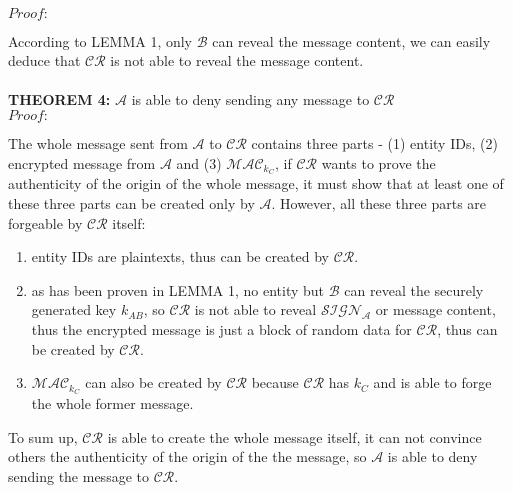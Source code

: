 \\
\emph{$Proof:$} \par
According to LEMMA 1, only $\mathcal{B}$ can reveal the message content, we can easily deduce that $\mathcal{CR}$ is not able to reveal the message content.
\\
\\
\textbf{THEOREM 4:} $\mathcal{A}$ is able to deny sending any message to $\mathcal{CR}$
\\
\emph{$Proof:$} \par
The whole message sent from $\mathcal{A}$ to $\mathcal{CR}$ contains three parts - (1) entity IDs, (2) encrypted message from $\mathcal{A}$ and (3) $\mathcal{MAC}_{k_C}$, if $\mathcal{CR}$ wants to prove the authenticity of the origin of the whole message, it must show that at least one of these three parts can be created only by $\mathcal{A}$. However, all these three parts are forgeable by $\mathcal{CR}$ itself:
\begin{enumerate}
\item entity IDs are plaintexts, thus can be created by $\mathcal{CR}$.
\item as has been proven in LEMMA 1, no entity but $\mathcal{B}$ can reveal the securely generated key $k_{AB}$, so $\mathcal{CR}$ is not able to reveal $\mathcal{SIGN_A}$ or message content, thus the encrypted message is just a block of random data for $\mathcal{CR}$, thus can be created by $\mathcal{CR}$.
\item $\mathcal{MAC}_{k_C}$ can also be created by $\mathcal{CR}$ because $\mathcal{CR}$ has $k_C$ and is able to forge the whole former message.
\end{enumerate}
To sum up, $\mathcal{CR}$ is able to create the whole message itself, it can not convince others the authenticity of the origin of the the message, so $\mathcal{A}$ is able to deny sending the message to $\mathcal{CR}$.


